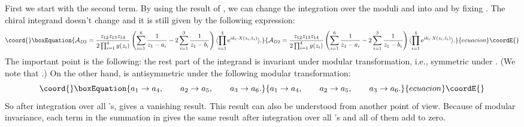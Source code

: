 \documentclass[a4paper,12pt]{article}
\begin{document}
First we start with the second term. By using the result of
\cite{IengoZhu3}, we can change the integration over the moduli
\coordHE{} and \coordHE{} into \coordHE{} and \coordHE{}
by fixing \coordHE{}. The chiral integrand doesn't change and it
is still given by the following expression:
\begin{equation}\coord{}\boxEquation{
{\cal A}_{D2}     =    {z_{12}z_{13}z_{14} \over 2 \prod_{i=1}^4
y(z_i)}  \left( \sum_{i=1}^6 {1\over z_1 - a_i}   - 2 \sum_{i=1}^3
{ 1 \over z_1 - b_i}\right)  \langle \prod_{i=1}^4 \hbox{e}^{i k_i
\cdot X(z_i, \bar z_i)} \rangle .
}{
{\cal A}_{D2}     =    {z_{12}z_{13}z_{14} \over 2 \prod_{i=1}^4
y(z_i)}  \left( \sum_{i=1}^6 {1\over z_1 - a_i}   - 2 \sum_{i=1}^3
{ 1 \over z_1 - b_i}\right)  \langle \prod_{i=1}^4 \hbox{e}^{i k_i
\cdot X(z_i, \bar z_i)} \rangle .
}{ecuacion}\coordE{}\end{equation}
The important point is the following: the rest part of the
integrand is invariant under modular transformation, i.e.,
symmetric under \coordHE{}. (We note that \coordHE{}.) On the other hand, \coordHE{} is antisymmetric under
the following modular transformation:
\begin{equation}\coord{}\boxEquation{
a_1 \to a_4 , \qquad a_2 \to a_5 , \qquad a_3 \to a_6.
}{
a_1 \to a_4 , \qquad a_2 \to a_5 , \qquad a_3 \to a_6.
}{ecuacion}\coordE{}\end{equation}
So after integration over all \coordHE{}'s, \coordHE{} gives a
vanishing result. This result can also be understood from another
point of view. Because of modular invariance, each term in the
summation in \coordHE{} gives the same result after
integration over all \coordHE{}'s and all of them add to zero.
\end{document}
